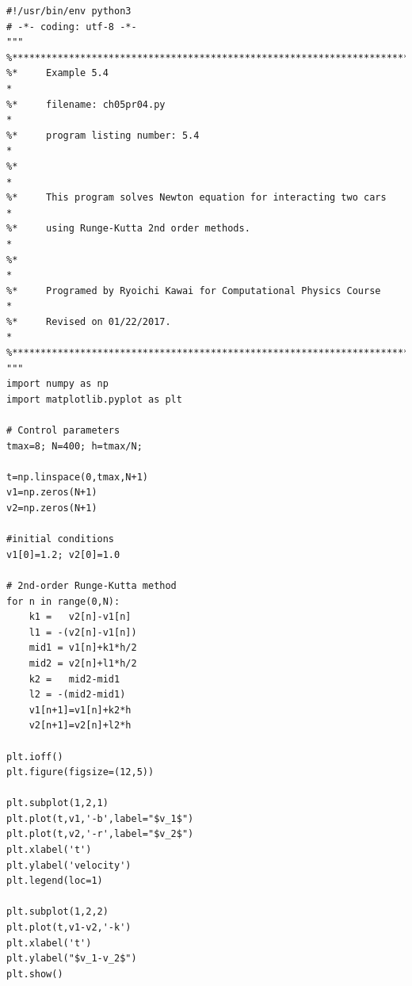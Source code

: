 \bigskip
\noindent
\program
\footnotesize
\begin{verbatim}
#!/usr/bin/env python3
# -*- coding: utf-8 -*-
"""
%**************************************************************************
%*     Example 5.4                                                        *
%*     filename: ch05pr04.py                                              *
%*     program listing number: 5.4                                        *
%*                                                                        *
%*     This program solves Newton equation for interacting two cars       *
%*     using Runge-Kutta 2nd order methods.                               *
%*                                                                        *
%*     Programed by Ryoichi Kawai for Computational Physics Course        *
%*     Revised on 01/22/2017.                                             *
%**************************************************************************
"""
import numpy as np
import matplotlib.pyplot as plt

# Control parameters
tmax=8; N=400; h=tmax/N;

t=np.linspace(0,tmax,N+1)
v1=np.zeros(N+1)
v2=np.zeros(N+1)

#initial conditions
v1[0]=1.2; v2[0]=1.0

# 2nd-order Runge-Kutta method
for n in range(0,N):
    k1 =   v2[n]-v1[n]
    l1 = -(v2[n]-v1[n])
    mid1 = v1[n]+k1*h/2
    mid2 = v2[n]+l1*h/2
    k2 =   mid2-mid1
    l2 = -(mid2-mid1)
    v1[n+1]=v1[n]+k2*h
    v2[n+1]=v2[n]+l2*h

plt.ioff()
plt.figure(figsize=(12,5))

plt.subplot(1,2,1) 
plt.plot(t,v1,'-b',label="$v_1$")
plt.plot(t,v2,'-r',label="$v_2$")
plt.xlabel('t')
plt.ylabel('velocity')
plt.legend(loc=1)

plt.subplot(1,2,2)
plt.plot(t,v1-v2,'-k')
plt.xlabel('t')
plt.ylabel("$v_1-v_2$")
plt.show()
\end{verbatim}

\normalsize
{}

